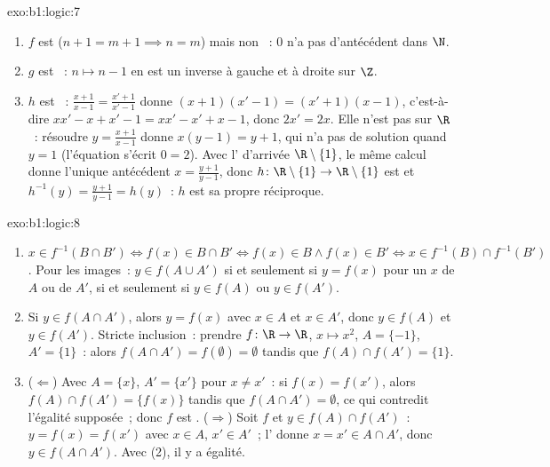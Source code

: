 \begin{solution}{exo:b1:logic:7}
\begin{enumerate}
  \item $f$ est  ($n + 1 = m + 1 \implies n = m$) mais non
        ~: $0$ n'a pas d'antécédent dans $\N$.
  \item $g$ est ~: $n \mapsto n - 1$ en est un inverse à
        gauche et à droite sur $\Z$.
  \item $h$ est ~: $\frac{x+1}{x-1} = \frac{x'+1}{x'-1}$ donne
        $(x+1)(x'-1) = (x'+1)(x-1)$, c'est-à-dire $xx' - x + x' - 1 =
        xx' - x' + x - 1$, donc $2x' = 2x$. Elle n'est pas 
        sur $\R$~: résoudre $y = \frac{x+1}{x-1}$ donne
        $x(y - 1) = y + 1$, qui n'a pas de solution quand $y = 1$
        (l'équation s'écrit $0 = 2$). Avec l' d'arrivée
        $\R \setminus \{1\}$, le même calcul donne l'unique antécédent
        $x = \frac{y+1}{y-1}$, donc
        $h \colon \R \setminus \{1\} \to \R \setminus \{1\}$ est
         et $h^{-1}(y) = \frac{y+1}{y-1} = h(y)$~: $h$ est sa
        propre réciproque.
\end{enumerate}
\end{solution}

\begin{solution}{exo:b1:logic:8}
\begin{enumerate}
  \item $x \in f^{-1}(B \cap B') \iff f(x) \in B \cap B' \iff f(x) \in
        B \land f(x) \in B' \iff x \in f^{-1}(B) \cap f^{-1}(B')$.
        Pour les images~: $y \in f(A \cup A')$ si et seulement si
        $y = f(x)$ pour un $x$ de $A$ ou de $A'$, si et seulement si
        $y \in f(A)$ ou $y \in f(A')$.
  \item Si $y \in f(A \cap A')$, alors $y = f(x)$ avec $x \in A$ et
        $x \in A'$, donc $y \in f(A)$ et $y \in f(A')$. Stricte
        inclusion~: prendre $f \colon \R \to \R$, $x \mapsto x^2$,
        $A = \{-1\}$, $A' = \{1\}$~: alors $f(A \cap A') =
        f(\emptyset) = \emptyset$ tandis que $f(A) \cap f(A') = \{1\}$.
  \item ($\Leftarrow$) Avec $A = \{x\}$, $A' = \{x'\}$ pour $x \neq
        x'$~: si $f(x) = f(x')$, alors $f(A) \cap f(A') = \{f(x)\}$
        tandis que $f(A \cap A') = \emptyset$, ce qui contredit
        l'égalité supposée~; donc $f$ est . ($\Rightarrow$)
        Soit $f$  et $y \in f(A) \cap f(A')$~: $y = f(x) =
        f(x')$ avec $x \in A$, $x' \in A'$~; l' donne
        $x = x' \in A \cap A'$, donc $y \in f(A \cap A')$. Avec (2),
        il y a égalité.
\end{enumerate}
\end{solution}

